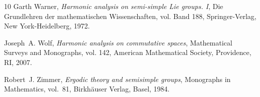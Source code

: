 \documentclass[12pt,reqno,a4paper]{amsart}
\theoremstyle{theorem}
\theoremstyle{definition}
\numberwithin{theorem}{section}
\numberwithin{equation}{section}
\begin{document}
\begin{thebibliography}{10}
Garth Warner, \emph{Harmonic analysis on semi-simple {L}ie groups. {I}}, Die
  Grundlehren der mathematischen Wissenschaften, vol. Band 188,
  Springer-Verlag, New York-Heidelberg, 1972. 

Joseph~A. Wolf, \emph{Harmonic analysis on commutative spaces}, Mathematical
  Surveys and Monographs, vol. 142, American Mathematical Society, Providence,
  RI, 2007. 

Robert~J. Zimmer, \emph{Ergodic theory and semisimple groups}, Monographs in
  Mathematics, vol.~81, Birkh\"auser Verlag, Basel, 1984. 

\end{thebibliography}
\end{document}
